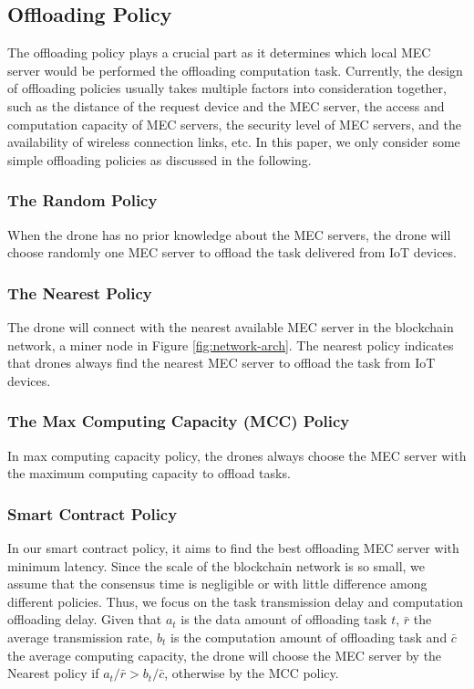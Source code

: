\subsection{Offloading Policy}
The offloading policy plays a crucial part as it determines which local MEC server would be performed the offloading computation task.
Currently, the design of offloading policies usually takes multiple factors into consideration together, such as the distance of the request device and the MEC server, the access and computation capacity of MEC servers, the security level of MEC servers, and the availability of wireless connection links, etc.
In this paper, we only consider some simple offloading policies as discussed in the following.

\subsubsection{The Random Policy}
When the drone has no prior knowledge about the MEC servers, the drone will choose randomly one MEC server to offload the task delivered from IoT devices.

\subsubsection{The Nearest Policy}
The drone will connect with the nearest available MEC server in the blockchain network, a miner node in Figure \ref{fig:network-arch}.
The nearest policy indicates that drones always find the nearest MEC server to offload the task from IoT devices.

\subsubsection{The Max Computing Capacity (MCC) Policy}
In max computing capacity policy, the drones always choose the MEC server with the maximum computing capacity to offload tasks.

\subsubsection{Smart Contract Policy}
 In our smart contract policy, it aims to find the best offloading MEC server with minimum latency.
 Since the scale of the blockchain network is so small, we assume that the consensus time is negligible or with little difference among different policies.
 Thus, we focus on the task transmission delay and computation offloading delay.
Given that $a_t$ is the data amount of offloading task $t$, $\bar{r}$ the average transmission rate, $b_t$ is the computation amount of offloading task and $\bar{c}$ the average computing capacity, the drone will choose the MEC server by the Nearest policy if $a_t/\bar{r}   >  b_t/\bar{c}$, otherwise by the MCC policy.





